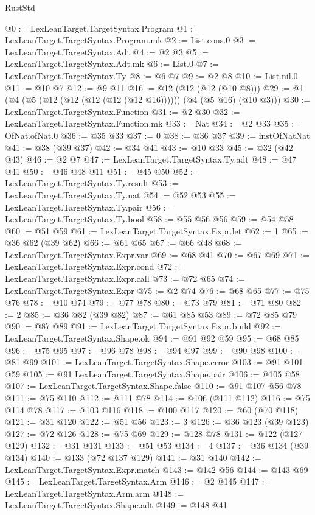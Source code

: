 \begin{lexlean}{RustStd}
\begin{coremodule}
{\begin{coremodule}
{{{{{{{{{{{{{{{{{{{{{{{{{{@0 := LexLeanTarget.TargetSyntax.Program
@1 := LexLeanTarget.TargetSyntax.Program.mk
@2 := List.cons.{0}
@3 := LexLeanTarget.TargetSyntax.Adt
@4 := @2 @3
@5 := LexLeanTarget.TargetSyntax.Adt.mk
@6 := List.{0}
@7 := LexLeanTarget.TargetSyntax.Ty
@8 := @6 @7
@9 := @2 @8
@10 := List.nil.{0}
@11 := @10 @7
@12 := @9 @11
@16 := @12 (@12 (@12 (@10 @8)))
@29 := @1 (@4 (@5 (@12 (@12 (@12 (@12 (@12 @16)))))) (@4 (@5 @16) (@10 @3)))
@30 := LexLeanTarget.TargetSyntax.Function
@31 := @2 @30
@32 := LexLeanTarget.TargetSyntax.Function.mk
@33 := Nat
@34 := @2 @33
@35 := OfNat.ofNat.{0}
@36 := @35 @33
@37 := 0
@38 := @36 @37
@39 := instOfNatNat
@41 := @38 (@39 @37)
@42 := @34 @41
@43 := @10 @33
@45 := @32 (@42 @43)
@46 := @2 @7
@47 := LexLeanTarget.TargetSyntax.Ty.adt
@48 := @47 @41
@50 := @46 @48 @11
@51 := @45 @50
@52 := LexLeanTarget.TargetSyntax.Ty.result
@53 := LexLeanTarget.TargetSyntax.Ty.nat
@54 := @52 @53
@55 := LexLeanTarget.TargetSyntax.Ty.pair
@56 := LexLeanTarget.TargetSyntax.Ty.bool
@58 := @55 @56 @56
@59 := @54 @58
@60 := @51 @59
@61 := LexLeanTarget.TargetSyntax.Expr.let
@62 := 1
@65 := @36 @62 (@39 @62)
@66 := @61 @65
@67 := @66 @48
@68 := LexLeanTarget.TargetSyntax.Expr.var
@69 := @68 @41
@70 := @67 @69
@71 := LexLeanTarget.TargetSyntax.Expr.cond
@72 := LexLeanTarget.TargetSyntax.Expr.call
@73 := @72 @65
@74 := LexLeanTarget.TargetSyntax.Expr
@75 := @2 @74
@76 := @68 @65
@77 := @75 @76
@78 := @10 @74
@79 := @77 @78
@80 := @73 @79
@81 := @71 @80
@82 := 2
@85 := @36 @82 (@39 @82)
@87 := @61 @85 @53
@89 := @72 @85 @79
@90 := @87 @89
@91 := LexLeanTarget.TargetSyntax.Expr.build
@92 := LexLeanTarget.TargetSyntax.Shape.ok
@94 := @91 @92 @59
@95 := @68 @85
@96 := @75 @95
@97 := @96 @78
@98 := @94 @97
@99 := @90 @98
@100 := @81 @99
@101 := LexLeanTarget.TargetSyntax.Shape.error
@103 := @91 @101 @59
@105 := @91 LexLeanTarget.TargetSyntax.Shape.pair
@106 := @105 @58
@107 := LexLeanTarget.TargetSyntax.Shape.false
@110 := @91 @107 @56 @78
@111 := @75 @110
@112 := @111 @78
@114 := @106 (@111 @112)
@116 := @75 @114 @78
@117 := @103 @116
@118 := @100 @117
@120 := @60 (@70 @118)
@121 := @31 @120
@122 := @51 @56
@123 := 3
@126 := @36 @123 (@39 @123)
@127 := @72 @126
@128 := @75 @69
@129 := @128 @78
@131 := @122 (@127 @129)
@132 := @31 @131
@133 := @51 @53
@134 := 4
@137 := @36 @134 (@39 @134)
@140 := @133 (@72 @137 @129)
@141 := @31 @140
@142 := LexLeanTarget.TargetSyntax.Expr.match
@143 := @142 @56
@144 := @143 @69
@145 := LexLeanTarget.TargetSyntax.Arm
@146 := @2 @145
@147 := LexLeanTarget.TargetSyntax.Arm.arm
@148 := LexLeanTarget.TargetSyntax.Shape.adt
@149 := @148 @41
}}}}}}}}}}}}}}}}}}}}}}}}}}
\end{coremodule}}
\end{coremodule}
\end{lexlean}
